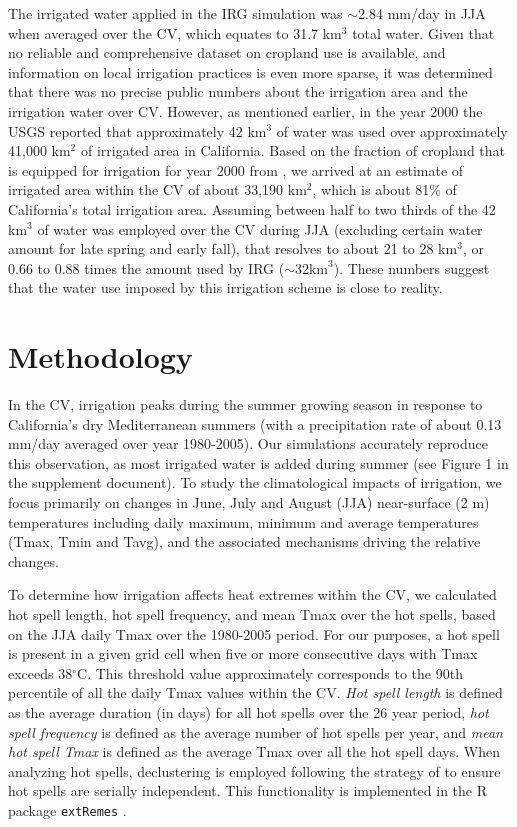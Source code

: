 \documentclass[draft,ms]{agutex}   %
\begin{document}
\begin{article}
The irrigated water applied in the IRG simulation was $\sim$2.84 mm/day in JJA when averaged over the CV, which equates to 31.7 km$^3$ total water. Given that no reliable and comprehensive dataset on cropland use is available, and information on local irrigation practices is even more sparse, it was determined that there was no precise public numbers about the irrigation area and the irrigation water over CV. However, as mentioned earlier, in the year 2000 the USGS reported that approximately 42 km$^3$ of water was used over approximately 41,000 km$^2$ of irrigated area in California. Based on the fraction of cropland that is equipped for irrigation for year 2000 from \citet{siebert2005development}, we arrived at an estimate of irrigated area within the CV of about 33,190 km$^2$, which is about 81$\%$ of California's total irrigation area.  Assuming between half to two thirds of the 42 km$^3$ of water was employed over the CV during JJA (excluding certain water amount for late spring and early fall), that resolves to about 21 to 28 km$^3$, or 0.66 to 0.88 times the amount used by IRG ($\sim32 \mbox{km}^3$). These numbers suggest that the water use imposed by this irrigation scheme is close to reality.


\section{Methodology}

In the CV, irrigation peaks during the summer growing season \citep{salas2006estimating} in response to California's dry Mediterranean summers (with a precipitation rate of about 0.13 mm/day averaged over year 1980-2005). Our simulations accurately reproduce this observation, as most irrigated water is added during summer (see Figure 1 in the supplement document). To study the  climatological impacts of irrigation, we focus primarily on changes in June, July and August (JJA) near-surface (2 m) temperatures including daily maximum, minimum and average temperatures (Tmax, Tmin and Tavg), and the associated mechanisms driving the relative changes. 

To determine how irrigation affects heat extremes within the CV, we calculated hot spell length, hot spell frequency, and mean Tmax over the hot spells, based on the JJA daily Tmax over the 1980-2005 period. For our purposes, a hot spell is present in a given grid cell when five or more consecutive days with Tmax exceeds 38$^\circ$C. This threshold value approximately corresponds to the 90th percentile of all the daily Tmax values within the CV. \textit{Hot spell length} is defined as the average duration (in days) for all  hot spells over the 26 year period, \textit{hot spell frequency} is defined as the average number of hot spells per year, and \textit{mean hot spell Tmax} is defined as the average Tmax over all the hot spell days. When analyzing hot spells, declustering is employed following the strategy of \cite{ferro2003inference} to ensure hot spells are serially independent.  This functionality is implemented in the R package \texttt{extRemes} \citep{gilleland2011new}.


\end{article}
\end{document}
